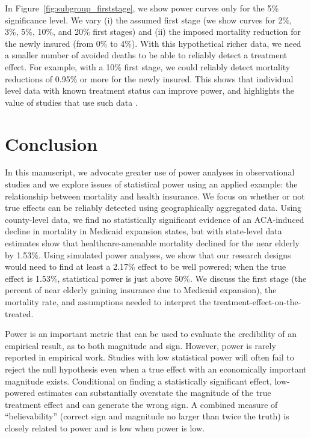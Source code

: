 \documentclass[12pt]{article}%
\begin{document}
In Figure~\ref{fig:subgroup_firststage}, we show power curves only for the 5\% significance level.  
We vary (i) the assumed first stage (we show curves for 2\%, 3\%, 5\%, 10\%, and 20\% first stages) and (ii) the imposed mortality reduction for the newly insured (from 0\% to 4\%). With this hypothetical richer data, we need a smaller number of avoided deaths to be able to reliably detect a treatment effect.  
For example, with a 10\% first stage, we could reliably detect mortality reductions of 0.95\% or more for the newly insured. 
This shows that individual level data with known treatment status  can improve power, and highlights the value of studies that use such data \citep{millerMedicaidMortalityNew2019,goldinHealthInsuranceMortality2021}. 


\vspace{-.5cm}
\section{Conclusion}\label{sec:conclusion}


In this manuscript, we advocate greater use of power analyses in observational studies and we explore issues of statistical power using an applied example: the relationship between mortality and health insurance. 
We focus on whether or not true effects can be reliably detected using geographically aggregated data. 
Using county-level data, we find no statistically significant evidence of an ACA-induced decline in mortality in Medicaid expansion states, but with state-level data estimates show that healthcare-amenable mortality declined for the near elderly by 1.53\%. 
Using simulated power analyses, we show that our research designs would need to find at least a 2.17\% effect to be well powered; when the true effect is 1.53\%, statistical power is just above 50\%. 
We discuss the first stage (the percent of near elderly gaining insurance due to Medicaid expansion), the mortality rate, and assumptions needed to interpret the treatment-effect-on-the-treated. 

Power is an important metric that can be used to evaluate the credibility of an empirical result, as to both magnitude and sign. 
However, power is rarely reported in empirical work. 
Studies with low statistical power will often fail to reject the null hypothesis even when a true effect with an economically important magnitude exists. 
Conditional on finding a statistically significant effect, low-powered estimates can substantially overstate the magnitude of the true treatment effect and can generate the wrong sign. 
A combined measure of ``believability'' (correct sign and magnitude no larger than twice the truth) is closely related to power and is low when power is low. 
\end{document}
